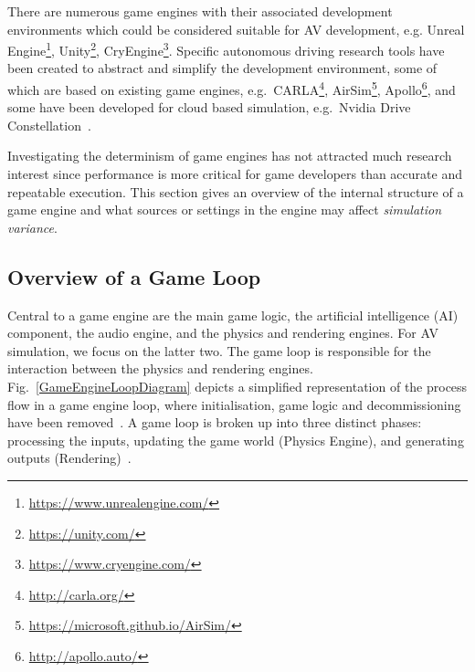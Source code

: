 \documentclass[letterpaper, 10 pt, journal, twoside]{IEEEtran}
\begin{document}
There are numerous game engines with their associated development environments which could be considered suitable for AV development, e.g. Unreal Engine\footnote{\url{https://www.unrealengine.com/}}, Unity\footnote{\url{https://unity.com/}}, CryEngine\footnote{\url{https://www.cryengine.com/}}. Specific autonomous driving research tools have been created to abstract and simplify the development environment, some of which are based on existing game engines, e.g.\ CARLA\footnote{\url{http://carla.org/}}, AirSim\footnote{\url{https://microsoft.github.io/AirSim/}}, Apollo\footnote{\url{http://apollo.auto/}}, and some have been developed for cloud based simulation, e.g.\ Nvidia Drive Constellation~\cite{nvidia_constellation}.

Investigating the determinism of game engines has not attracted much research interest since performance is more critical for game developers than accurate and repeatable execution.  %
This section gives an overview of the internal structure of a game engine and what sources or settings in the engine may affect \textit{simulation variance}.
%

\subsection{Overview of a Game Loop} \label{GameLoopSection}

Central to a game engine are the main game logic, the artificial intelligence (AI) component, the audio engine, and the physics and rendering engines. For AV simulation, we focus on the latter two.
%
The game loop is responsible for the interaction between the physics and rendering engines. Fig.~\ref{GameEngineLoopDiagram} depicts a simplified representation of the process flow in a game engine loop, where  initialisation, game logic and decommissioning have been removed~\cite{unity_event_execution}.
A game loop is broken up into three distinct phases: processing the inputs, updating the game world (Physics Engine), and generating outputs (Rendering)~\cite{GameEngineArchBook}.
\end{document}
